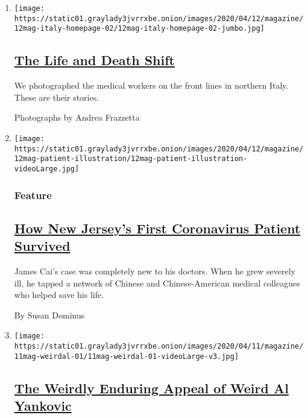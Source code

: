 \begin{enumerate}
\def\labelenumi{\arabic{enumi}.}
\item
  \texttt{[image: https://static01.graylady3jvrrxbe.onion/images/2020/04/12/magazine/12mag-italy-homepage-02/12mag-italy-homepage-02-jumbo.jpg]}

  \hypertarget{the-life-and-death-shift}{%
  \subsection{\texorpdfstring{\href{/interactive/2020/04/07/magazine/italy-hospitals-covid.html}{The
  Life and Death
  Shift}}{The Life and Death Shift}}\label{the-life-and-death-shift}}

  We photographed the medical workers on the front lines in northern
  Italy. These are their stories.

  Photographs by Andrea Frazzetta
\item
  \texttt{[image: https://static01.graylady3jvrrxbe.onion/images/2020/04/12/magazine/12mag-patient-illustration/12mag-patient-illustration-videoLarge.jpg]}

  \hypertarget{feature}{%
  \subsubsection{Feature}\label{feature}}

  \hypertarget{how-new-jerseys-first-coronavirus-patient-survived}{%
  \subsection{\texorpdfstring{\href{/2020/04/05/magazine/first-coronavirus-patient-new-jersey.html}{How
  New Jersey's First Coronavirus Patient
  Survived}}{How New Jersey's First Coronavirus Patient Survived}}\label{how-new-jerseys-first-coronavirus-patient-survived}}

  James Cai's case was completely new to his doctors. When he grew
  severely ill, he tapped a network of Chinese and Chinese-American
  medical colleagues who helped save his life.

  By Susan Dominus
\item
  \texttt{[image: https://static01.graylady3jvrrxbe.onion/images/2020/04/11/magazine/11mag-weirdal-01/11mag-weirdal-01-videoLarge-v3.jpg]}

  \hypertarget{the-weirdly-enduring-appeal-of-weird-al-yankovic}{%
  \subsection{\texorpdfstring{\href{/2020/04/09/magazine/weird-al-yankovic.html}{The
  Weirdly Enduring Appeal of Weird Al
  Yankovic}}{The Weirdly Enduring Appeal of Weird Al Yankovic}}\label{the-weirdly-enduring-appeal-of-weird-al-yankovic}}


\end{enumerate}
